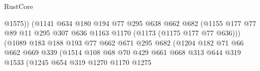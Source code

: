 \begin{lexlean}{RustCore}
\begin{coremodule}
                                          @1575))
                                      (@1141
                                        @634
                                        @180
                                        @194
                                        @77
                                        @295
                                        @638
                                        @662
                                        @682
                                        (@1155
                                          @177
                                          @77
                                          @89
                                          @11
                                          @295
                                          @307
                                          @636
                                          @1163
                                          @1170
                                          (@1173 (@1175 @177 @77 @636)))
                                        (@1089
                                          @183
                                          @188
                                          @193
                                          @77
                                          @662
                                          @671
                                          @295
                                          @682
                                          (@1204
                                            @182
                                            @71
                                            @66
                                            @662
                                            @669
                                            @339
                                            (@1514
                                              @108
                                              @68
                                              @70
                                              @429
                                              @661
                                              @668
                                              @313
                                              @644
                                              @319
                                              @1533
                                              (@1245
                                                @654
                                                @319
                                                @1270
                                                @1170
                                                @1275

\end{coremodule}
\end{lexlean}
